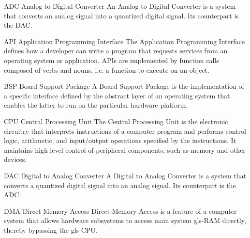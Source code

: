 \usepackage[xindy, nopostdot, numberedsection, style=super, section, toc, acronyms, nogroupskip]{glossaries}
\usepackage{xparse}

\setlength{\glsdescwidth}{0.8\textwidth}
\renewcommand{\glsnamefont}[1]{\textbf{#1}}

 {
}

\makeglossaries
{}%
  {ADC}%
  {Analog to Digital Converter}%
  {An Analog to Digital Converter is a system that converts an analog signal
   into a quantized digital signal. Its counterpart is the \gls{DAC}.}%

%
  {API}%
  {Application Programming Interface}%
  {The Application Programming Interface defines how a developer can write
   a program that requests services from an operating system or application.
   \glspl{API} are implemented by function calls composed of verbs and nouns,
   i.e. a function to execute on an object.}%

%
  {BSP}%
  {Board Support Package}%
  {A Board Support Package is the implementation of a specific interface defined
   by the abstract layer of an operating system that enables the latter to run
   on the particular hardware platform.}%

%
  {CPU}%
  {Central Processing Unit}%
  {The Central Processing Unit is the electronic circuitry that interprets
  instructions of a computer program and performs control logic, arithmetic,
  and input/output operations specified by the instructions. It maintains
  high-level control of peripheral components, such as memory and other devices.}%

%
  {DAC}%
  {Digital to Analog Converter}%
  {A Digital to Analog Converter is a system that converts a quantized digital
   signal into an analog signal. Its counterpart is the \gls{ADC}.}%

%
  {DMA}%
  {Direct Memory Access}%
  {Direct Memory Access is a feature of a computer system that allows hardware
   subsystems to access main system \gls{gls-RAM} directly, thereby bypassing
   the \gls{gls-CPU}.}%

